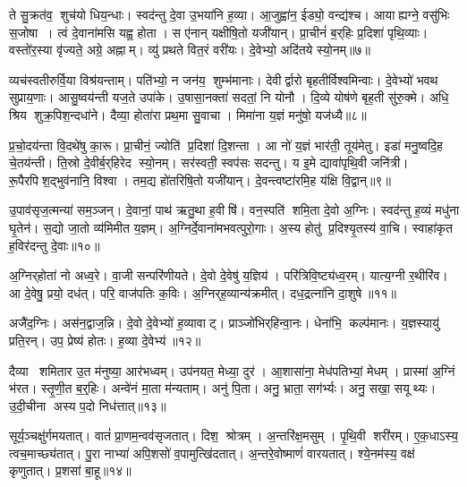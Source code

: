 ते सु॒क्रत॑व॒ शुच॑यो धिय॒न्धाः।
स्वद॑न्तु दे॒वा उ॒भया॑नि ह॒व्या।
आ॒जुह्वा॑न॒ ईड्यो॒ वन्द्य॑श्च।
आयाह्यग्ने॒ वसु॑भिः स॒जोषा।
त्वं दे॒वाना॑मसि यह्व॒ होता।
स ए॑नान् यक्षीषि॒तो यजी॑यान्।
प्रा॒चीनं॑ ब॒र्‌हिः प्र॒दिशा॑ पृथि॒व्याः।
वस्तो॑र॒स्या वृ॑ज्यते॒ अग्रे॒ अह्नाम्।
व्यु॑ प्रथते वित॒रं वरी॑यः।
दे॒वेभ्यो॒ अदि॑तये स्यो॒नम्॥७॥

व्यच॑स्वतीरुर्वि॒या विश्र॑यन्ताम्।
पति॑भ्यो॒ न जन॑य॒ शुम्भ॑मानाः।
देवीर्द्वारो बृहतीर्विश्वमिन्वाः।
दे॒वेभ्यो॑ भवथ सुप्राय॒णाः।
आसु॒ष्वय॑न्ती यज॒ते उपा॑के।
उ॒षासा॒नक्ता॑ सदतां॒ नि योनौ।
दि॒व्ये योष॑णे बृह॒ती सु॑रु॒क्मे।
अधि॒ श्रिय शुक्र॒पिश॒न्दधा॑ने।
दैव्या॒ होता॑रा प्रथ॒मा सु॒वाचा।
मिमा॑ना य॒ज्ञं मनु॑षो॒ यज॑ध्यै॥८॥

प्र॒चो॒दय॑न्ता वि॒दथे॑षु का॒रू।
प्रा॒चीनं॒ ज्योति॑ प्र॒दिशा॑ दि॒शन्ता।
आ नो॑ य॒ज्ञं भार॑ती॒ तूय॑मेतु।
इडा॑ मनु॒ष्वदि॒ह चे॒तय॑न्ती।
ति॒स्रो दे॒वीर्ब॒र्‌हिरेद स्यो॒नम्।
सर॑स्वती॒ स्वप॑सः सदन्तु।
य इ॒मे द्यावा॑पृथि॒वी जनि॑त्री।
रू॒पैरपिश॒द्भुव॑नानि॒ विश्वा।
तम॒द्य हो॑तरिषि॒तो यजी॑यान्।
दे॒वन्त्वष्टा॑रमि॒ह य॑क्षि वि॒द्वान्॥९॥

उ॒पाव॑सृज॒त्मन्या॑ सम॒ञ्जन्।
दे॒वानां॒ पाथ॑ ऋतु॒था ह॒वीषि॑।
वन॒स्पति॑ शमि॒ता दे॒वो अ॒ग्निः।
स्वद॑न्तु ह॒व्यं मधु॑ना घृ॒तेन॑।
स॒द्यो जा॒तो व्य॑मिमीत य॒ज्ञम्।
अ॒ग्निर्दे॒वाना॑मभवत्पुरो॒गाः।
अ॒स्य होतु॑ प्र॒दिश्यृ॒तस्य॑ वा॒चि।
स्वाहा॑कृत ह॒विर॑दन्तु दे॒वाः॥१०॥\anuvakamend[य॒ज्ञैः स्यो॒नं यज॑ध्यै वि॒द्वान॒ष्टौ च॑]

अ॒ग्निर्‌होता॑ नो अध्व॒रे।
वा॒जी सन्परि॑णीयते।
दे॒वो दे॒वेषु॑ य॒ज्ञिय॑।
परि॑त्रिवि॒ष्ट्य॑ध्व॒रम्।
यात्य॒ग्नी र॒थीरि॑व।
आ दे॒वेषु॒ प्रयो॒ दध॑त्।
परि॒ वाज॑पतिः क॒विः।
अ॒ग्निर्‌ह॒व्यान्य॑क्रमीत्।
दध॒द्रत्ना॑नि दा॒शुषे॥११॥\anuvakamend[अ॒ग्निर्‌होता॑ नो॒ नव॑]

अजै॑द॒ग्निः।
अस॑न॒द्वाज॒न्नि।
दे॒वो दे॒वेभ्यो॑ ह॒व्यावाट्।
प्राञ्जो॑भिर्‌हिन्वा॒नः।
धेना॑भि॒ कल्प॑मानः।
य॒ज्ञस्यायु॑ प्रति॒रन्।
उप॒ प्रेष्य॑ होतः।
ह॒व्या दे॒वेभ्य॑॥१२॥\anuvakamend[अजै॑द॒ष्टौ]

दैव्या शमितार उ॒त म॑नुष्या॒ आर॑भध्वम्।
उप॑नयत॒ मेध्या॒ दुर॑।
आ॒शासा॑ना॒ मेध॑पतिभ्यां॒ मेधम्।
प्रास्मा॑ अ॒ग्निं भ॑रत।
स्तृ॒णी॒त ब॒र्॒हिः।
अन्वे॑नं मा॒ता म॑न्यताम्।
अनु॑ पि॒ता।
अनु॒ भ्राता॒ सग॑र्भ्यः।
अनु॒ सखा॒ सयूथ्यः।
उ॒दी॒चीना अस्य प॒दो निध॑त्तात्॥१३॥

सूर्य॒ञ्चक्षु॑र्गमयतात्।
वातं॑ प्रा॒णम॒न्वव॑सृजतात्।
दिश॒ श्रोत्रम्।
अ॒न्तरि॑क्ष॒मसुम्।
पृ॒थि॒वी शरी॑रम्।
ए॒क॒धाऽस्य॒ त्वच॒माच्छ्य॑तात्।
पु॒रा नाभ्या॑ अपि॒शसो॑ व॒पामुत्खि॑दतात्।
अ॒न्तरे॒वोष्माणं॑ वारयतात्।
श्ये॒नम॑स्य॒ वक्ष॑ कृणुतात्।
प्र॒शसा॑ बा॒हू॥१४॥

